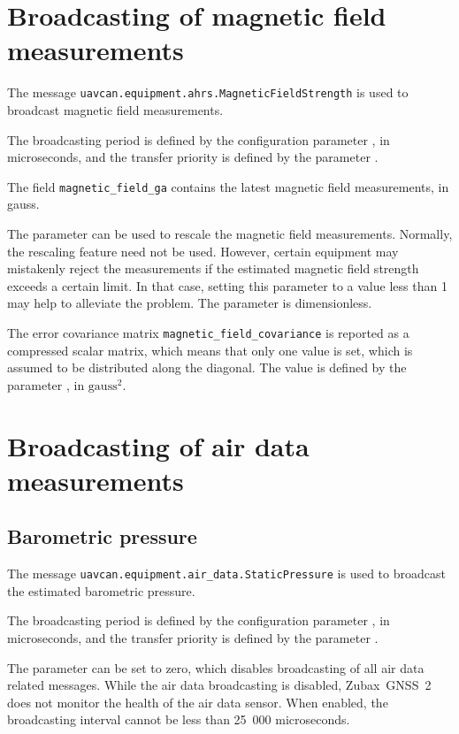 \documentclass{zubaxdoc}
\begin{document}
\section{Broadcasting of magnetic field measurements}

The message \verb|uavcan.equipment.ahrs.MagneticFieldStrength| is used to broadcast magnetic field measurements.

The broadcasting period is defined by the configuration
parameter , in microseconds, and the transfer priority is defined by the
parameter .

The field \verb|magnetic_field_ga| contains the latest magnetic field measurements, in gauss.

The parameter  can be used to rescale the magnetic field measurements.
Normally, the rescaling feature need not be used.
However, certain equipment may mistakenly reject the measurements if the estimated
magnetic field strength exceeds a certain limit. In that case, setting this parameter to a value
less than 1 may help to alleviate the problem.
The parameter is dimensionless.

The error covariance matrix \verb|magnetic_field_covariance| is reported as a compressed scalar matrix,
which means that only one value is set, which is assumed to be distributed along the diagonal.
The value is defined by the parameter , in $\text{gauss}^2$.

\section{Broadcasting of air data measurements}

\subsection{Barometric pressure}

The message \verb|uavcan.equipment.air_data.StaticPressure| is used to broadcast the
estimated barometric pressure.

The broadcasting period is defined by the configuration
parameter , in microseconds, and the transfer priority is defined by the
parameter .

The parameter  can be set to zero, which disables broadcasting of all
air data related messages.
While the air data broadcasting is disabled, Zubax~GNSS~2 does not monitor the health of the
air data sensor.
When enabled, the broadcasting interval cannot be less than 25~000 microseconds.
\end{document}
